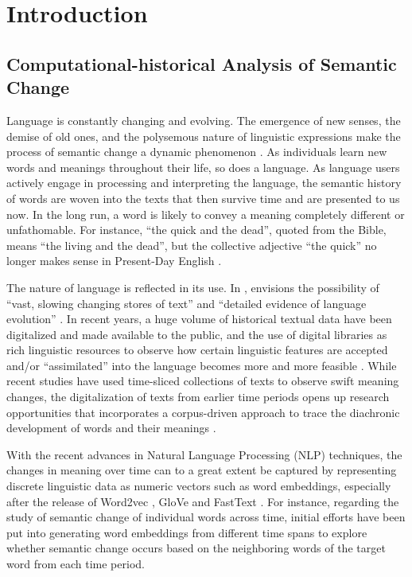 

\chapter{Introduction}
\section{Computational-historical Analysis of Semantic Change}
Language is constantly changing and evolving. The emergence of new senses, the demise of old ones, and the polysemous nature of linguistic expressions make the process of semantic change a dynamic phenomenon \parencite{robertinvanhove2008}. As individuals learn new words and meanings throughout their life, so does a language. As language users actively engage in processing and interpreting the language, the semantic history of words are woven into the texts that then survive time and are presented to us now. In the long run, a word is likely to convey a meaning completely different or unfathomable. For instance, ``the quick and the dead'', quoted from the Bible, means ``the living and the dead'', but the collective adjective ``the quick'' no longer makes sense in Present-Day English \parencite[199]{semanticincrowley2010}.

The nature of language is reflected in its use. In \citeyear{sinclair1982reflections}, \citeauthor{sinclair1982reflections} envisions the possibility of ``vast, slowing changing stores of text'' and ``detailed evidence of language evolution'' . In recent years, a huge volume of historical textual data have been digitalized and made available to the public, and the use of digital libraries as rich linguistic resources to observe how certain linguistic features are accepted and/or ``assimilated'' into the language becomes more and more feasible \parencite{renouf2002time}. While recent studies have used time-sliced collections of texts to observe swift meaning changes, the digitalization of texts from earlier time periods opens up research opportunities that incorporates a corpus-driven approach to trace the diachronic development of words and their meanings \parencite{kutuzov2018survey,tahmasebi2018survey,camacho2018survey,hamilton2016cultural,jawahar2019contextualized}.

With the recent advances in Natural Language Processing (NLP) techniques, the changes in meaning over time can to a great extent be captured by representing discrete linguistic data as numeric vectors such as word embeddings, especially after the release of Word2vec \parencite{mikolov2013efficient}, GloVe \parencite{pennington2014glove} and FastText \parencite{bojanowski2016enriching}. For instance, regarding the study of semantic change of individual words across time, initial efforts have been put into generating word embeddings from different time spans to explore whether semantic change occurs based on the neighboring words of the target word from each time period.

